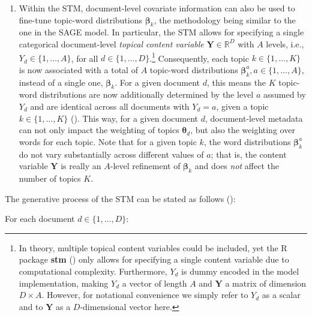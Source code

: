 \begin{enumerate}[label=(\roman*)]
\item Within the STM, document-level covariate information can also be used to fine-tune topic-word distributions $\boldsymbol{\beta}_k$, the methodology being similar to the one in the SAGE model. In particular, the STM allows for specifying a single categorical document-level \textit{topical content variable} $\boldsymbol{Y}\in \mathbb{R}^D$ with $A$ levels, i.e., $Y_d \in \{1,\dots,A\}$, for all $d \in \{1,\dots,D\}$.\footnote{In theory, multiple topical content variables could be included, yet the R package \textbf{stm} (\citealp{stm}) only allows for specifying a single content variable due to computational complexity. Furthermore, $Y_d$ is dummy encoded in the model implementation, making $Y_d$ a vector of length $A$ and $\boldsymbol{Y}$ a matrix of dimension $D \times A$. However, for notational convenience we simply refer to $Y_d$ as a scalar and to $\boldsymbol{Y}$ as a $D$-dimensional vector here.} Consequently, each topic $k \in \{1,\dots,K\}$ is now associated with a total of $A$ topic-word distributions $\boldsymbol{\beta}_k^{a}, a \in \{1,\dots,A\}$, instead of a single one, $\boldsymbol{\beta}_k$. For a given document $d$, this means the $K$ topic-word distributions are now additionally determined by the level $a$ assumed by $Y_d$ and are identical across all documents with $Y_d = a$, given a topic $k \in \{1,\dots,K\}$ (\citealp{roberts2016model}). This way, for a given document $d$, document-level metadata can not only impact the weighting of topics $\boldsymbol{\theta}_d$, but also the weighting over words for each topic. Note that for a given topic $k$, the word distributions $\boldsymbol{\beta}_k^{a}$ do not vary substantially across different values of $a$; that is, the content variable $\boldsymbol{Y}$ is really an $A$-level refinement of $\boldsymbol{\beta}_k$ and does \textit{not} affect the number of topics $K$.
\end{enumerate}

\noindent
The generative process of the STM can be stated as follows (\citealp{roberts2016model}):

\vspace{0.25cm}
\noindent
For each document $d \in \{1,\dots,D\}$:

